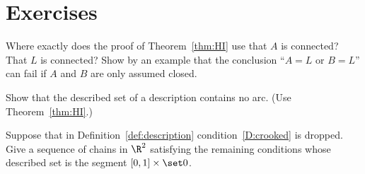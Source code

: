 
\section*{Exercises}

\begin{exercise}
Where exactly does the proof of Theorem~\ref{thm:HI} use that $A$ is connected? That $L$ is
connected? Show by an example that the conclusion ``$A=L$ or $B=L$'' can fail if $A$ and $B$
are only assumed closed.
\end{exercise}

\begin{exercise}
Show that the described set of a description contains no arc. (Use Theorem~\ref{thm:HI}.)
\end{exercise}

\begin{exercise}
Suppose that in Definition~\ref{def:description} condition~\ref{D:crooked} is dropped. Give a
sequence of chains in $\R^2$ satisfying the remaining conditions whose described set is the
segment $[0,1]\times\set0$.
\end{exercise}
